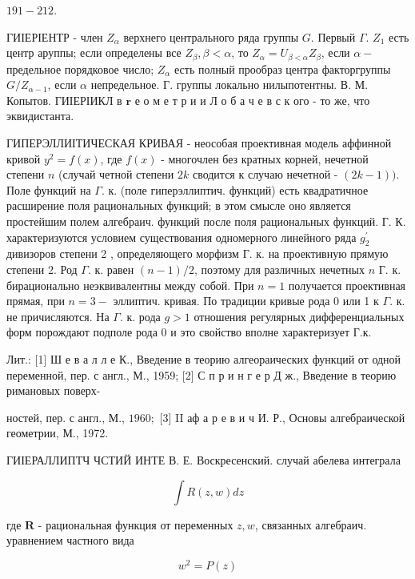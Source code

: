 \documentclass[10pt]{article}
\begin{document}
$191-212$.



ГИІЕРІЕНТР - член $Z_{\alpha}$ верхнего центрального ряда группы $G$. Первый $\Gamma$. $Z_{1}$ есть центр аруппы; если определены все $Z_{\beta}, \beta<\alpha$, то $Z_{\alpha}=U_{\beta<\alpha} Z_{\beta}$, если $\alpha-$ предельное порядковое число; $Z_{\alpha}$ есть полный прообраз центра факторгруппы $G / Z_{\alpha-1}$, если $\alpha$ непредельное. Г. группы локально нилыпотентны. В. М. Копытов. ГИІЕРІИКЛ в $\boldsymbol{r}$ е о м е т р и и Л о б а ч е в с к ого - то же, что эквидистанта.



ГИПЕРЭЛЛИІТИЧЕСКАЯ КРИВАЯ - неособая проективная модель аффинной кривой $y^{2}=f(x)$, где $f(x)$ - многочлен без кратных корней, нечетной степени $n$ (случай четной степени $2 k$ сводится к случаю нечетной - $(2 k-1))$. Поле функций на $\Gamma$. к. (поле гиперэллиптич. функций) есть квадратичное расширение поля рациональных функций; в этом смысле оно является простейшим полем алгебраич. функций после поля рациональных функций. Г. К. характеризуются условием существования одномерного линейного ряда $g_{2}^{\prime}$ дивизоров степени 2 , определяющего морфизм $Г$. к. на проективную прямую степени 2. Род $\Gamma$. к. равен $(n-1) / 2$, поэтому для различных нечетных $n$ Г. к. бирационально неэквивалентны между собой. При $n=1$ получается проективная прямая, при $n=3-$ эллиптич. кривая. По традиции кривые рода 0 или 1 к $\Gamma$. к. не причисляются. На $\Gamma$. к. рода $g>1$ отношения регулярных дифференциальных форм порождают подполе рода 0 и это свойство вполне характеризует Г.к.



Лит.: [1] Ш е в а л л е К., Введение в теорию алгеораических функций от одной переменной, пер. с англ., М., 1959; [2] С п р и н г е р Д ж., Введение в теорию римановых поверх-

ностей, пер. с англ., М., $1960 ;$ [3] II аф а р е в и ч И. Р., Основы алгебраической геометрии, М., 1972.



ГИІЕРАЛЛИПТЧ ЧСТИЙ ИНТЕ В. Е. Воскресенский. случай абелева интеграла



\[

\int R(z, w) d z

\]



где $\boldsymbol{R}$ - рациональная функция от переменных $z, w$, связанных алгебраич. уравнением частного вида



\[

w^{2}=P(z)

\]
\end{document}
